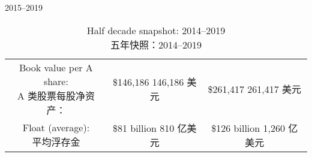 \begin{chapter}{2015--2019}
\begin{table}[!htbp]
\begin{center}
\begin{tabular}{ccc}
      \makecell[c]{Book value per A share: \\ A 类股票每股净资产：} & \makecell[c]{\$146,186 \\ 146,186 美元} & \makecell[c]{\$261,417 \\ 261,417 美元} \\
      \makecell[c]{Float (average): \\ 平均浮存金} & \makecell[c]{\$81 billion \\ 810 亿美元} & \makecell[c]{\$126 billion \\ 1,260 亿美元} \\
      \bottomrule
    \end{tabular}
    \caption{Half decade snapshot: 2014--2019 \\ 五年快照：2014--2019}
  \end{center}
\end{table}


\end{chapter}
